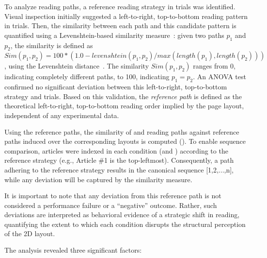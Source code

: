 To analyze reading paths, a reference reading strategy in \condzeronot trials was identified. Visual inspection initially suggested a left-to-right, top-to-bottom reading pattern in \condzeronot trials. Then, the similarity between each path and this candidate pattern is quantified using a Levenshtein-based similarity measure~\cite{levenshtein2007}: given two paths $p_1$ and $p_2$, the similarity is defined as $Sim(p_1,p_2) = 100*(1.0 - levenshtein(p_1,p_2)/max(length(p_1), length(p_2)))
$, using the Levenshtein distance~\cite{levenshtein2007}. The similarity  $Sim(p_1,p_2)$ ranges from 0, indicating completely different paths, to 100, indicating $p_1 = p_2$. An ANOVA test confirmed no significant deviation between this left-to-right, top-to-bottom strategy and \condzeronot trials. Based on this validation,  the {\itshape reference path} is defined as the theoretical left-to-right, top-to-bottom reading order implied by the page layout, independent of any experimental data.

Using the reference paths, the similarity of \condonenot and \condtwonot reading paths against reference paths induced over the corresponding layouts is computed ().  To enable sequence comparison,  articles were indexed in each condition (\condonenot and \condtwonot) according to the reference strategy (e.g., Article \#1 is the top-leftmost). Consequently, a path adhering to the reference strategy results in the canonical sequence [1,2,...,n], while any deviation will be captured by the similarity measure.

It is important to note that any deviation from this reference path is not considered a performance failure or a ``negative'' outcome. Rather,  such deviations are interpreted as behavioral evidence of a strategic shift in reading, quantifying the extent to which each condition disrupts the structural perception of the 2D layout.

The analysis revealed three significant factors:

